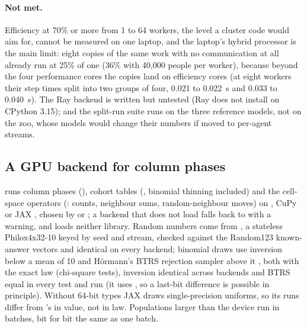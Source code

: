 \paragraph{Not met.} Efficiency at 70\% or more from 1 to 64 workers, the level a
cluster code would aim for, cannot be measured on one laptop, and the laptop's hybrid
processor is the main limit: eight copies of the same work with no communication at all
already run at 25\% of one (36\% with 40,000 people per worker), because beyond the four
performance cores the copies land on efficiency cores (at eight workers their step times
split into two groups of four, 0.021 to 0.022~s and 0.033 to 0.040~s). The Ray backend is written but untested (Ray does not install on CPython 3.15); and the split-run suite runs on the three
reference models, not on the zoo, whose models would change their numbers if moved to
per-agent streams.

\subsection{A GPU backend for column phases}
\label{app:gpu}

 runs column phases (), cohort tables
(, binomial thinning included) and the cell-space operators
(: counts, neighbour sums, random-neighbour moves) on ,
CuPy \citep{okuta2017cupy} or JAX \citep{bradbury2018jax}, chosen by  or
; a backend that does not load falls back to  with a
warning, and  loads neither library. Random numbers come from
, a stateless Philox4x32-10 \citep{salmon2011parallel} keyed by seed and
stream, checked against the Random123 known-answer vectors and identical on every backend;
binomial draws use inversion below a mean of 10 and Hörmann's BTRS rejection sampler above it
\citep{hormann1993generation}, both with the exact law (chi-square tests), inversion identical
across backends and BTRS equal in every test and run (it uses , so a last-bit
difference is possible in principle). Without 64-bit types JAX draws single-precision
uniforms, so its runs differ from 's in value, not in law. Populations larger
than the device run in batches, bit for bit the same as one batch.


